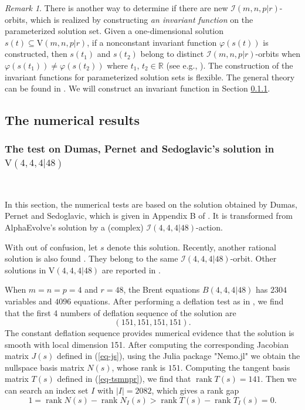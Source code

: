 \documentclass[reqno]{amsart}
\theoremstyle{definition}
\numberwithin{equation}{section}
\theoremstyle{remark}
\newtheorem{remark}[theorem]{Remark}
\begin{document}
\begin{remark}\label{remk-invf}
There is another way to determine if there are new $\mathcal{I}(m,n,p|r)$-orbits, which is realized by constructing \emph{an invariant function} \cite{olver93li,olver99c} on the parameterized solution set. Given a one-dimensional solution $s(t)\subseteq \mathrm{V}(m,n,p|r)$,
if a nonconstant invariant function $\varphi(s(t))$ is constructed, then 
$s(t_1)$ and $s(t_2)$ belong to distinct $\mathcal{I}(m,n,p|r)$-orbits when
$\varphi(s(t_1))\neq\varphi(s(t_2))$ where $t_1$, $t_2\in \mathbb{R}$ (see e.g., \cite[Example 4.20]{olver99c}). The construction of the invariant functions for parameterized solution sets is flexible. The general theory can be found in \cite{Hubert07sa,Kogan23inv}. We will construct an invariant function in Section \ref{subs-testdps}.
\end{remark}


\subsection{The numerical results}

\subsubsection{The test on Dumas, Pernet and Sedoglavic's solution in $\mathrm{V}(4,4,4|48)$} \label{subs-testdps}
\ 

In this section, the numerical tests are based on the solution obtained by Dumas, Pernet and Sedoglavic, which is given in Appendix B of \cite{dumas25}. It is transformed from AlphaEvolve's solution \cite{novikov25ae} by a (complex) $\mathcal{I}(4,4,4|48)$-action.  

With out of confusion, let $s$ denote this solution. Recently, another rational solution is also found \cite{moran26}. They belong to the same $\mathcal{I}(4,4,4|48)$-orbit.
Other solutions in $\mathrm{V}(4,4,4|48)$ are reported in \cite{kaporin24-cmmp,kaporin24-Dokl}.

When $m=n=p=4$ and $r=48$, the Brent equations $B(4,4,4|48)$ has 
$2304$ variables and $4096$ equations.
After performing a deflation test as in \cite{li25def}, we find that the first 4 numbers of deflation sequence of the solution are
$$(151,151,151,151).$$
The constant deflation sequence provides numerical evidence that
the solution is smooth with local dimension 151. After computing the corresponding Jacobian matrix $J(s)$ defined in (\ref{eq-js}), using the Julia package "Nemo.jl" we obtain the nullspace basis matrix $N(s)$, whose rank is $151$. Computing the tangent basis matrix $T(s)$ defined in (\ref{eq-tsmnpr}), we find that
$\operatorname{rank}T(s)=141$. Then we can search an index set $I$ with $|I|=2082$, which gives a rank gap
\begin{equation}\label{eq-gap1}
1=\operatorname{rank}N(s)-\operatorname{rank}N_I(s)>\operatorname{rank}T(s)-\operatorname{rank}T_I(s)=0.
\end{equation}
\end{document}
